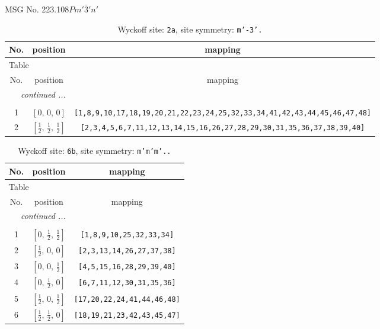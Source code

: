 \documentclass[fleqn,8pt]{jsarticle}
\begin{document}
\setcounter{MaxMatrixCols}{32}

\renewcommand{\tablename}{Table~}
\renewcommand{\figurename}{Figure~}
\begin{center}
\LARGE
MSG No. 223.108\quad$Pm'\bar{3}'n'$
\end{center}
\renewcommand{\arraystretch}{1.2}
\begin{longtable}{ccc}
\caption{Wyckoff site: {\tt 2a}, site symmetry: {\tt m'-3'.}}
 \\
 \hline \hline
No. & position & mapping \\ \hline \endfirsthead

\multicolumn{2}{l}{\tablename\ \thetable{}} \\
 \hline \hline
No. & position & mapping \\ \hline \endhead

 \hline \hline
\multicolumn{2}{r}{\footnotesize\it continued ...} \\ \endfoot

 \hline \hline
\multicolumn{2}{r}{} \\ \endlastfoot

1 & $\left[ 0,\, 0,\, 0 \right]$ & {\tt [1,8,9,10,17,18,19,20,21,22,23,24,25,32,33,34,41,42,43,44,45,46,47,48]} \\ \hline
2 & $\left[ \frac{1}{2},\, \frac{1}{2},\, \frac{1}{2} \right]$ & {\tt [2,3,4,5,6,7,11,12,13,14,15,16,26,27,28,29,30,31,35,36,37,38,39,40]} \\
\end{longtable}
\renewcommand{\arraystretch}{1.2}
\begin{longtable}{ccc}
\caption{Wyckoff site: {\tt 6b}, site symmetry: {\tt m'm'm'..}}
 \\
 \hline \hline
No. & position & mapping \\ \hline \endfirsthead

\multicolumn{2}{l}{\tablename\ \thetable{}} \\
 \hline \hline
No. & position & mapping \\ \hline \endhead

 \hline \hline
\multicolumn{2}{r}{\footnotesize\it continued ...} \\ \endfoot

 \hline \hline
\multicolumn{2}{r}{} \\ \endlastfoot

1 & $\left[ 0,\, \frac{1}{2},\, \frac{1}{2} \right]$ & {\tt [1,8,9,10,25,32,33,34]} \\ \hline
2 & $\left[ \frac{1}{2},\, 0,\, 0 \right]$ & {\tt [2,3,13,14,26,27,37,38]} \\ \hline
3 & $\left[ 0,\, 0,\, \frac{1}{2} \right]$ & {\tt [4,5,15,16,28,29,39,40]} \\ \hline
4 & $\left[ 0,\, \frac{1}{2},\, 0 \right]$ & {\tt [6,7,11,12,30,31,35,36]} \\ \hline
5 & $\left[ \frac{1}{2},\, 0,\, \frac{1}{2} \right]$ & {\tt [17,20,22,24,41,44,46,48]} \\ \hline
6 & $\left[ \frac{1}{2},\, \frac{1}{2},\, 0 \right]$ & {\tt [18,19,21,23,42,43,45,47]} \\
\end{longtable}
\end{document}
